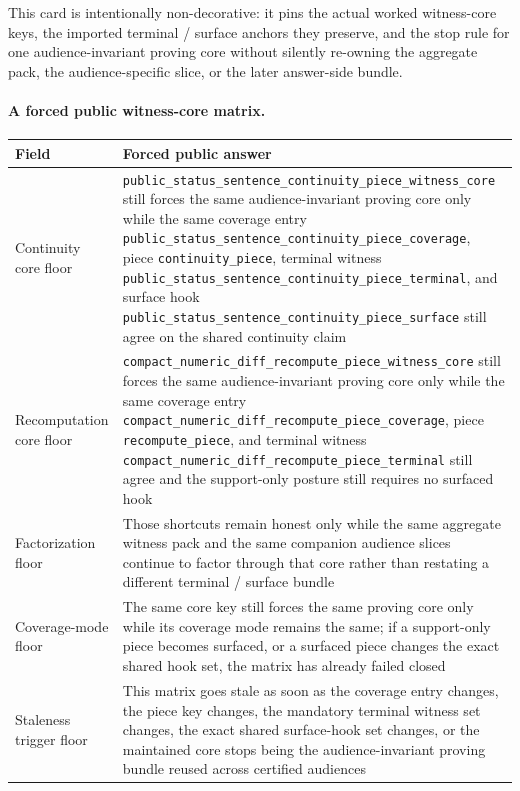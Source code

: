 \documentclass[11pt]{article}
\begin{document}
This card is intentionally non-decorative: it pins the actual worked witness-core keys, the imported terminal / surface anchors they preserve, and the stop rule for one audience-invariant proving core without silently re-owning the aggregate pack, the audience-specific slice, or the later answer-side bundle.\cite{series:workedexample}

\paragraph{A forced public witness-core matrix.}
\begin{table}[t]
\centering
\small
\begin{tabularx}{\linewidth}{@{}LY@{}}
\toprule
Field & Forced public answer \\
\midrule
Continuity core floor & \nolinkurl{public_status_sentence_continuity_piece_witness_core} still forces the same audience-invariant proving core only while the same coverage entry \nolinkurl{public_status_sentence_continuity_piece_coverage}, piece \nolinkurl{continuity_piece}, terminal witness \nolinkurl{public_status_sentence_continuity_piece_terminal}, and surface hook \nolinkurl{public_status_sentence_continuity_piece_surface} still agree on the shared continuity claim \\
Recomputation core floor & \nolinkurl{compact_numeric_diff_recompute_piece_witness_core} still forces the same audience-invariant proving core only while the same coverage entry \nolinkurl{compact_numeric_diff_recompute_piece_coverage}, piece \nolinkurl{recompute_piece}, and terminal witness \nolinkurl{compact_numeric_diff_recompute_piece_terminal} still agree and the support-only posture still requires no surfaced hook \\
Factorization floor & Those shortcuts remain honest only while the same aggregate witness pack and the same companion audience slices continue to factor through that core rather than restating a different terminal / surface bundle \\
Coverage-mode floor & The same core key still forces the same proving core only while its coverage mode remains the same; if a support-only piece becomes surfaced, or a surfaced piece changes the exact shared hook set, the matrix has already failed closed \\
Staleness trigger floor & This matrix goes stale as soon as the coverage entry changes, the piece key changes, the mandatory terminal witness set changes, the exact shared surface-hook set changes, or the maintained core stops being the audience-invariant proving bundle reused across certified audiences \\

\end{tabularx}
\end{table}
\end{document}

